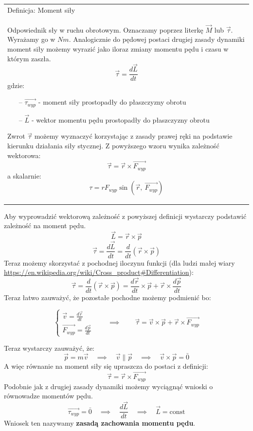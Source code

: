 \documentclass[a4paper]{article}
\newenvironment{definition}[2][Definicja]
    {
        \begin{center}
        \begin{tabular}{|p{1\textwidth}|}
        \hline
            #1: #2\\[2ex]
        \begin{em}
        \Large
    }
    { 
        \end{em}
        \\\hline
        \end{tabular} 
        \end{center}
    }
\begin{document}
    \begin{definition}{Moment siły}
        Odpowiednik sły w ruchu obrotowym. Oznaczamy poprzez literkę $\vec{M}$ lub $\vec{\tau}$.
        Wyrażamy go w $Nm$. Analogicznie do pędowej postaci drugiej zasady dynamiki moment siły możemy
        wyrazić jako iloraz zmiany momentu pędu i czasu w którym zaszła.
        \[\vec{\tau} = \frac{d\vec{L}}{dt}\]
        gdzie:
        \begin{itemize}
            \item[--] $\vec{\tau_{wyp}}$ - moment siły prostopadły do płaszczyzny obrotu
            \item[--] $\vec{L}$ - wektor momentu pędu prostopadły do płaszczyzny obrotu
        \end{itemize}
        Zwrot $\vec{\tau}$ możemy wyznaczyć korzystając z zasady prawej ręki na podstawie kierunku działania
        siły stycznej. Z powyższego wzoru wynika zależność wektorowa:
        \[\vec{\tau} = \vec{r} \times \vec{F_{wyp}}\]
        a skalarnie:
        \[\tau = rF_{wyp}\sin(\vec{r},\ \vec{F_{wyp}})\]
    \end{definition}
    Aby wyprowadzić wektorową zależność z powyższej definicji wystarczy podstawić zależność na moment pędu.
    \[\vec{L} = \vec{r} \times \vec{p}\]
    \[\vec{\tau} = \frac{d\vec{L}}{dt} = \frac{d}{dt}\left( \vec{r} \times \vec{p} \right)\]
    Teraz możemy skorzystać z pochodnej iloczynu funkcji (dla ludzi małej wiary 
    \url{https://en.wikipedia.org/wiki/Cross_product#Differentiation}):
    \[\vec{\tau} = \frac{d}{dt}\left( \vec{r} \times \vec{p} \right) = 
    \frac{d\vec{r}}{dt}\times\vec{p} + \vec{r} \times \frac{d\vec{p}}{dt}\]
    Teraz łatwo zauważyć, że pozostałe pochodne możemy podmienić bo:

    \[\begin{cases}
        \vec{v} = \frac{d\vec{r}}{dt} \\
        \vec{F_{wyp}} = \frac{d\vec{p}}{dt}
    \end{cases} \qquad\implies\qquad \vec{\tau} = \vec{v} \times \vec{p} + \vec{r}\times\vec{F_{wyp}}\]

    Teraz wystarczy zauważyć, że: 
    \[\vec{p} = m\vec{v} \quad\implies\quad \vec{v} \parallel \vec{p} \quad\implies\quad 
    \vec{v} \times \vec{p} = \bar{0}\]
    A więc równanie na moment siły się upraszcza do postaci z definicji:
    \[\vec{\tau} = \vec{r}\times\vec{F_{wyp}}\]
    Podobnie jak z drugiej zasady dynamiki możemy wyciągnąć wnioski o równowadze momentów pędu.
    \[\vec{\tau_{wyp}} = \bar{0} \quad\implies\quad \frac{d\vec{L}}{dt} \quad\implies\quad \vec{L} 
    = \text{const}\]
    Wniosek ten nazywamy \textbf{zasadą zachowania momentu pędu}.
\end{document}
